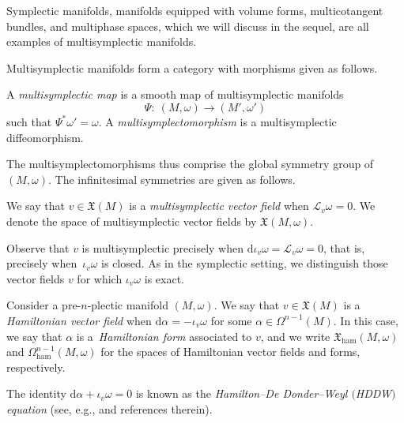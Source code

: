\documentclass[10pt,a4paper]{amsart}
\numberwithin{equation}{section}
\newcommand{\ham}{\text{ham}}
\renewcommand{\L}{\mathscr{L}}
\newcommand{\X}{\mathfrak{X}}
\renewcommand{\d}{\mathrm{d}}
\begin{document}
Symplectic manifolds, manifolds equipped with volume forms, multicotangent bundles, and multiphase spaces, which we will discuss in the sequel, are all examples of multisymplectic manifolds.

Multisymplectic manifolds form a category with morphisms given as follows.

\begin{Definition}
	A \emph{multisymplectic map} is a smooth map of multisymplectic manifolds
\[
\Psi\colon \ (M,\omega) \to (M',\omega')
\]
 such that $\Psi^* \omega' = \omega$. A \emph{multisymplectomorphism} is a multisymplectic diffeomorphism.
\end{Definition}

The multisymplectomorphisms thus comprise the global symmetry group of $(M,\omega)$. The infinitesimal symmetries are given as follows.

\begin{Definition}\label{def:multisymplectic_vector_field}
	We say that $v\in\X(M)$ is a \emph{multisymplectic vector field} when $\L_v\omega = 0$. We denote the space of multisymplectic vector fields by $\X(M,\omega)$.
\end{Definition}

Observe that $v$ is multisymplectic precisely when $\d\iota_v\omega=\L_v\omega=0$, that is, precisely when~$\iota_v\omega$ is closed. As in the symplectic setting, we distinguish those vector fields $v$ for which $\iota_v\omega$ is exact.

\begin{Definition}\label{def:multisymplectic_Hamiltonian_vector_field}
	Consider a pre-$n$-plectic manifold $(M,\omega)$. We say that $v\in\X(M)$ is a \emph{Hamiltonian vector field} when $\d\alpha=-\iota_v\omega$ for some $\alpha\in\Omega^{n-1}(M)$. In this case, we say that $\alpha$ is a~\emph{Hamiltonian form} associated to $v$, and we write $\X_\ham(M,\omega)$ and $\Omega_\ham^{n-1}(M,\omega)$ for the spaces of Hamiltonian vector fields and forms, respectively.
\end{Definition}

\begin{Remark}
	The identity $\d\alpha +\iota_v\omega=0$ is known as the \emph{Hamilton--De Donder--Weyl $($HDDW$)$ equation} (see, e.g., \cite{Helein04,RyvkinWurzbacher18} and references therein).
\end{Remark}
\end{document}
